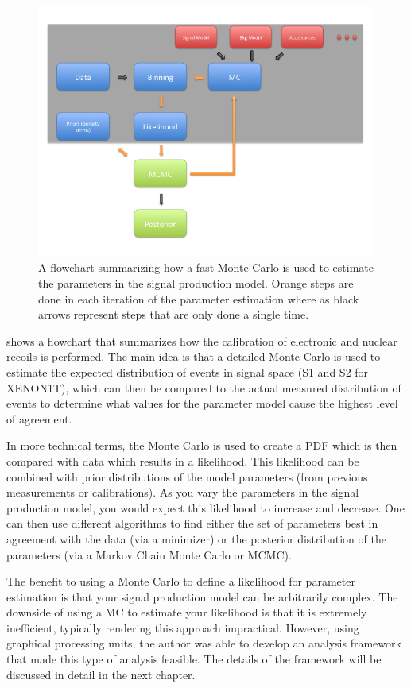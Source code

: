 \begin{figure}
        \centering
	\includegraphics[width=0.99\textwidth]{xe1t_fast_mc_flowchart}
	\caption{A flowchart summarizing how a fast Monte Carlo is used to estimate the parameters in the signal production model.  Orange steps are done in each iteration of the parameter estimation where as black arrows represent steps that are only done a single time.}
	\label{fig:xe1t_fast_mc_flowchart}
\end{figure}


 shows a flowchart that summarizes how the calibration of electronic and nuclear recoils is performed.  The main idea is that a detailed Monte Carlo is used to estimate the expected distribution of events in signal space (S1 and S2 for XENON1T), which can then be compared to the actual measured distribution of events to determine what values for the parameter model cause the highest level of agreement. 

In more technical terms, the Monte Carlo is used to create a PDF which is then compared with data which results in a likelihood.  This likelihood can be combined with prior distributions of the model parameters (from previous measurements or calibrations).  As you vary the parameters in the signal production model, you would expect this likelihood to increase and decrease.  One can then use different algorithms to find either the set of parameters best in agreement with the data (via a minimizer) or the posterior distribution of the parameters (via a Markov Chain Monte Carlo or MCMC).

The benefit to using a Monte Carlo to define a likelihood for parameter estimation is that your signal production model can be arbitrarily complex.  The downside of using a MC to estimate your likelihood is that it is extremely inefficient, typically rendering this approach impractical.  However, using graphical processing units, the author was able to develop an analysis framework that made this type of analysis feasible.  The details of the framework will be discussed in detail in the next chapter.

